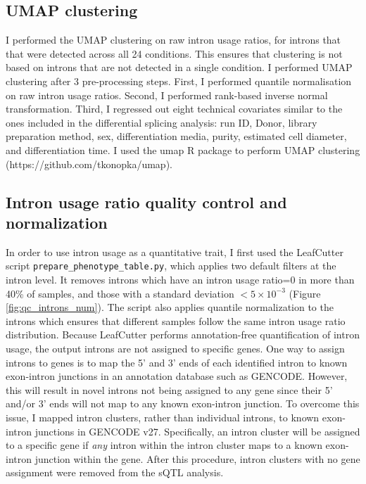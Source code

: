 \subsection{UMAP clustering}
I performed the UMAP clustering on raw intron usage ratios, for introns that that were detected across all 24 conditions. This ensures that clustering is not based on introns that are not detected in a single condition. I performed UMAP clustering after 3 pre-processing steps. First, I performed quantile normalisation on raw intron usage ratios. Second, I performed rank-based inverse normal transformation. Third, I regressed out eight technical covariates similar to the ones included in the differential splicing analysis: run ID, Donor, library preparation method, sex, differentiation media, purity, estimated cell diameter, and differentiation time. I used the umap R package to perform UMAP clustering (https://github.com/tkonopka/umap). 

\subsection{Intron usage ratio quality control and normalization}
In order to use intron usage as a quantitative trait, I first used the LeafCutter script \linebreak \Verb+prepare_phenotype_table.py+, which applies two default filters at the intron level. It removes introns which have an intron usage ratio=0 in more than 40\% of samples, and those with a standard deviation $< 5\times10^{-3}$ (Figure \ref{fig:qc_introns_num}). The script also applies quantile normalization to the introns which ensures that different samples follow the same intron usage ratio distribution. Because LeafCutter performs annotation-free quantification of intron usage, the output introns are not assigned to specific genes. One way to assign introns to genes is to map the 5' and 3' ends of each identified intron to known exon-intron junctions in an annotation database such as GENCODE. However, this will result in novel introns not being assigned to any gene since their 5' and/or 3' ends will not map to any known exon-intron junction. To overcome this issue, I mapped intron clusters, rather than individual introns, to known exon-intron junctions in GENCODE v27. Specifically, an intron cluster will be assigned to a specific gene if \textit{any} intron within the intron cluster maps to a known exon-intron junction within the gene. After this procedure, intron clusters with no gene assignment were removed from the sQTL analysis. 


